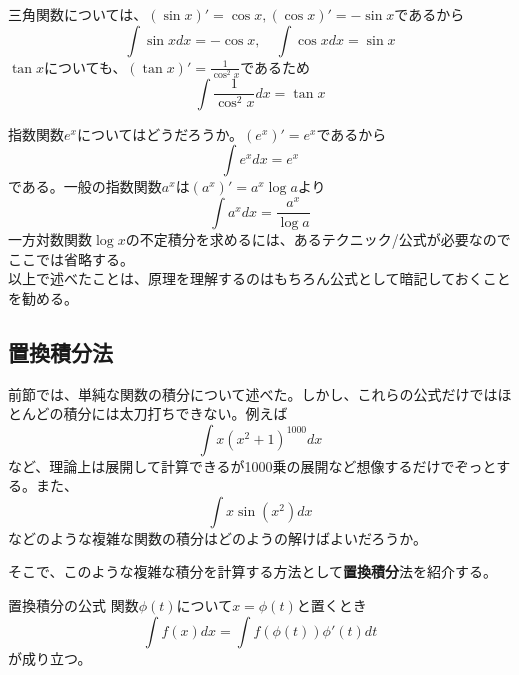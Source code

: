\documentclass[a4j,dvipdfmx]{jsarticle}
\begin{document}
                三角関数については、$(\sin x)'=\cos x,(\cos x)'=-\sin x$であるから
                \begin{equation}
                    \int \sin xdx = -\cos x,\quad \int \cos x dx = \sin x \label{eq:sin,cosの積分}
                \end{equation}
                $\tan x$についても、$(\tan x)'=\frac{1}{\cos ^2x}$であるため
                \begin{equation}
                    \int \frac{1}{\cos^2 x}dx=\tan x \label{eq:tanの不定積分}
                \end{equation}

                指数関数$e^x$についてはどうだろうか。$(e^x)'=e^x$であるから
                \begin{equation}
                    \int e^x dx = e^x \label{eq:expの不定積分}
                \end{equation}
                である。一般の指数関数$a^x$は$(a^x)'=a^x \log a$より
                \begin{equation}
                    \int a^x dx =\frac{a^x}{\log a} \label{eq:a^xの不定積分}
                \end{equation}
                一方対数関数$\log x$の不定積分を求めるには、あるテクニック/公式が必要なのでここでは省略する。\\

                以上で述べたことは、原理を理解するのはもちろん公式として暗記しておくことを勧める。

            \clearpage
            \subsection{置換積分法}
                前節では、単純な関数の積分について述べた。しかし、これらの公式だけではほとんどの積分には太刀打ちできない。例えば
                \begin{equation*}
                    \int x(x^2+1)^{1000}dx
                \end{equation*}
                など、理論上は展開して計算できるが1000乗の展開など想像するだけでぞっとする。また、
                \begin{equation*}
                    \int x\sin(x^2)dx
                \end{equation*}
                などのような複雑な関数の積分はどのようの解けばよいだろうか。

                そこで、このような複雑な積分を計算する方法として\textbf{置換積分}法を紹介する。
                \begin{itembox}{置換積分の公式}
                    関数$\phi(t)$について$x=\phi(t)$と置くとき
                    \begin{equation}
                        \int f(x)dx = \int f(\phi(t))\phi'(t)dt \label{eq:置換積分}
                    \end{equation}
                    が成り立つ。
                \end{itembox}
\end{document}

